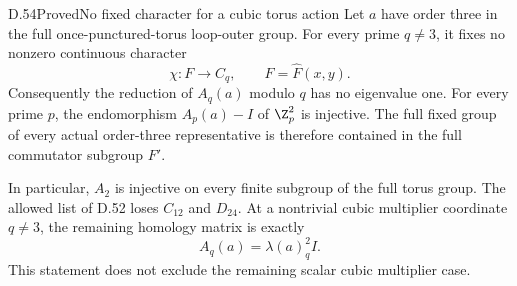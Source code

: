 \begin{claim}{D.54}{Proved}{No fixed character for a cubic torus action}
Let $a$ have order three in the full
once-punctured-torus loop-outer group.
For every prime $q\ne3$, it fixes no nonzero
continuous character
\[
                         \chi:F\longrightarrow C_q,
                      \qquad F=\widehat F(x,y).         \tag{D.54a}
\]
Consequently the reduction of $A_q(a)$ modulo
$q$ has no eigenvalue one.
For every prime $p$, the endomorphism
$A_p(a)-I$ of $\Z_p^2$ is injective.
The full fixed group of every actual
order-three representative is therefore
contained in the full commutator subgroup
$F'$.

In particular, $A_2$ is injective on every
finite subgroup of the full torus group.
The allowed list of D.52 loses
$C_{12}$ and $D_{24}$.
At a nontrivial cubic multiplier
coordinate $q\ne3$, the remaining
homology matrix is exactly
\[
                         A_q(a)=\lambda(a)_q^2 I.
                                                               \tag{D.54b}
\]
This statement does not exclude the
remaining scalar cubic multiplier case.
\end{claim}
